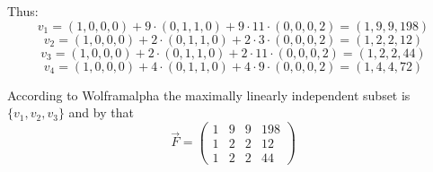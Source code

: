         Thus:
        \[ v_1 = (1,0,0,0) + 9 \cdot (0,1,1,0) + 9 \cdot 11 \cdot (0,0,0,2) = (1,9,9,198) \]
        \[ v_2 = (1,0,0,0) + 2 \cdot (0,1,1,0) + 2 \cdot 3 \cdot (0,0,0,2) = (1,2,2,12) \]
        \[ v_3 = (1,0,0,0) + 2 \cdot (0,1,1,0) + 2 \cdot 11 \cdot (0,0,0,2) = (1,2,2,44) \]
        \[ v_4 = (1,0,0,0) + 4 \cdot (0,1,1,0) + 4 \cdot 9 \cdot (0,0,0,2) = (1,4,4,72) \]
        
        According to Wolframalpha the maximally linearly independent subset is $\{v_1, v_2, v_3\}$ and by that
        \[ \overrightarrow{F} = \begin{pmatrix}
                                    1 & 9 & 9 & 198 \\
                                    1 & 2 & 2 & 12  \\
                                    1 & 2 & 2 & 44
                                \end{pmatrix}
        \]
        
